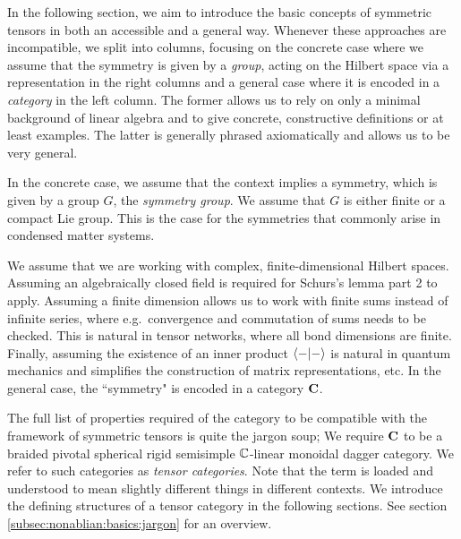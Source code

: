 In the following section, we aim to introduce the basic concepts of symmetric tensors in both an accessible and a general way.
%
Whenever these approaches are incompatible, we split into columns, focusing on the concrete case where we assume that the symmetry is given by a \emph{group}, acting on the Hilbert space via a representation in the right columns and a general case where it is encoded in a \emph{category} in the left column.
%
The former allows us to rely on only a minimal background of linear algebra and to give concrete, constructive definitions or at least examples.
%
The latter is generally phrased axiomatically and allows us to be very general.

%
\begin{doublecol}
    In the concrete case, we assume that the context implies a symmetry, which is given by a group $G$,
    the \emph{symmetry group}.
    We assume that $G$ is either finite or a compact Lie group.
    This is the case for the symmetries that commonly arise in condensed matter systems.
    
    We assume that we are working with complex, finite-dimensional Hilbert spaces.
    Assuming an algebraically closed field is required for Schurs's lemma part 2 to apply.
    Assuming a finite dimension allows us to work with finite sums instead of infinite series, where e.g.~convergence and commutation of sums needs to be checked.
    This is natural in tensor networks, where all bond dimensions are finite.
    Finally, assuming the existence of an inner product $\braket{\blank}{\blank}$ is natural in quantum mechanics and simplifies the construction of matrix representations, etc.
\colswitch
    In the general case, the ``symmetry" is encoded in a category $\mathbf{C}$.
    
    The full list of properties required of the category to be compatible with the framework of symmetric tensors is quite the jargon soup;
    We require $\mathbf{C}$ to be a braided pivotal spherical rigid semisimple $\mathbb{C}$-linear monoidal dagger category.
    We refer to such categories as \emph{tensor categories}.
    Note that the term is loaded and understood to mean slightly different things in different contexts.
    We introduce the defining structures of a tensor category in the following sections.
    See section \ref{subsec:nonablian:basics:jargon} for an overview.
    

\end{doublecol}
